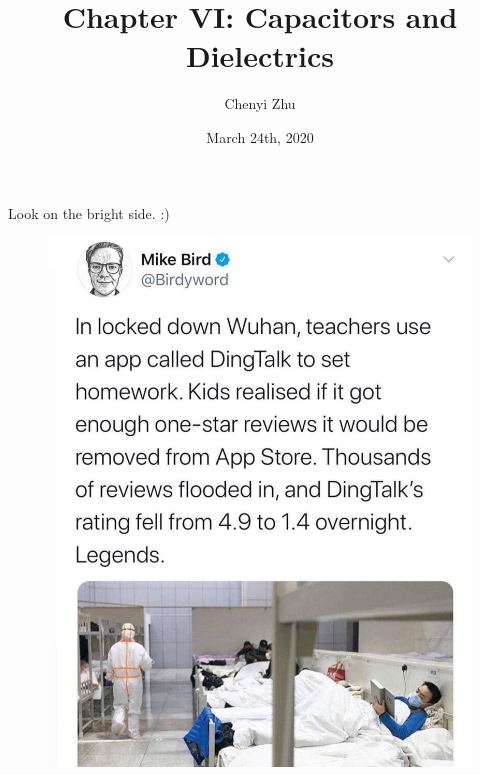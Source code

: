 \documentclass[11pt, letterpaper]{article}
\title{Chapter VI: Capacitors and Dielectrics}
\author{Chenyi Zhu}
\date{March 24th, 2020}
\begin{document}
\begin{titlingpage}
	\maketitle
	
	\begin{center}
		Look on the bright side. :)
	\end{center}
	
	\begin{figure}[h!]
		\centering
		\includegraphics[scale=0.2]{tweet}
		\label{fig:flux}
	\end{figure}
		
\end{titlingpage}
	
\end{document}

